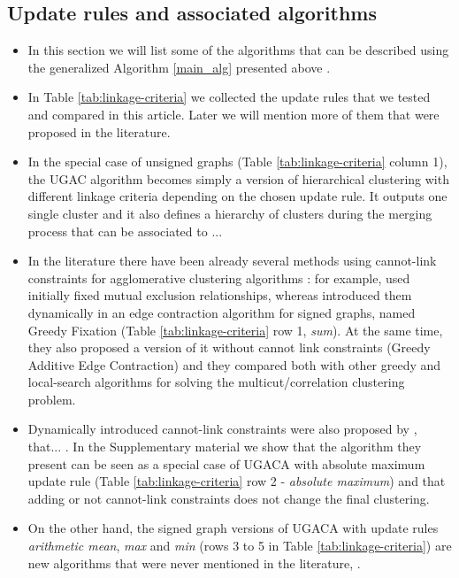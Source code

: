 \subsection{Update rules and associated algorithms}
\begin{itemize}
\item In this section we will list some of the algorithms that can be described using the generalized Algorithm \ref{main_alg} presented above .
\item In Table \ref{tab:linkage-criteria} we collected the update rules that we tested and compared in this article. Later we will mention more of them that were proposed in the literature.
\item In the special case of unsigned graphs (Table \ref{tab:linkage-criteria} column 1), the UGAC algorithm becomes simply a version of hierarchical clustering with different linkage criteria depending on the chosen update rule. It outputs one single cluster and it also defines a hierarchy of clusters during the merging process that can be associated to ...   
\item In the literature there have been already several methods using cannot-link constraints for agglomerative clustering algorithms : for example, \cite{malmberg2011generalized} used initially fixed mutual exclusion relationships, whereas \cite{levinkov2017comparative} introduced them dynamically in an edge contraction algorithm for signed graphs, named Greedy Fixation (Table \ref{tab:linkage-criteria} row 1, \emph{sum}). At the same time, they also proposed a version of it without cannot link constraints (Greedy Additive Edge Contraction) and they compared both with other greedy and local-search algorithms for solving the multicut/correlation clustering problem.
\item Dynamically introduced cannot-link constraints were also proposed by \cite{wolf2018mutex}, that... . In the Supplementary material we show that the algorithm they present can be seen as a special case of UGACA with absolute maximum update rule (Table \ref{tab:linkage-criteria} row 2 - \emph{absolute maximum}) and that adding or not cannot-link constraints does not change the final clustering.
\item On the other hand, the signed graph versions of UGACA with update rules \emph{arithmetic mean}, \emph{max} and \emph{min} (rows 3 to 5 in Table \ref{tab:linkage-criteria}) are new algorithms that were never mentioned in the literature, .

\end{itemize}
